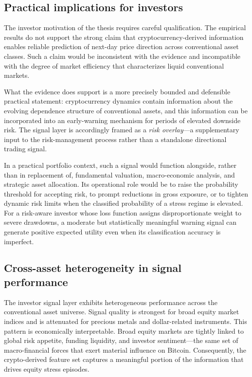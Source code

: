 \subsection{Practical implications for investors}

The investor motivation of the thesis requires careful qualification. The empirical results do not support the strong claim that cryptocurrency-derived information enables reliable prediction of next-day price direction across conventional asset classes. Such a claim would be inconsistent with the evidence and incompatible with the degree of market efficiency that characterizes liquid conventional markets.

What the evidence does support is a more precisely bounded and defensible practical statement: cryptocurrency dynamics contain information about the evolving dependence structure of conventional assets, and this information can be incorporated into an early-warning mechanism for periods of elevated downside risk. The signal layer is accordingly framed as a \emph{risk overlay}---a supplementary input to the risk-management process rather than a standalone directional trading signal.

In a practical portfolio context, such a signal would function alongside, rather than in replacement of, fundamental valuation, macro-economic analysis, and strategic asset allocation. Its operational role would be to raise the probability threshold for accepting risk, to prompt reductions in gross exposure, or to tighten dynamic risk limits when the classified probability of a stress regime is elevated. For a risk-aware investor whose loss function assigns disproportionate weight to severe drawdowns, a moderate but statistically meaningful warning signal can generate positive expected utility even when its classification accuracy is imperfect.

\subsection{Cross-asset heterogeneity in signal performance}

The investor signal layer exhibits heterogeneous performance across the conventional asset universe. Signal quality is strongest for broad equity market indices and is attenuated for precious metals and dollar-related instruments. This pattern is economically interpretable. Broad equity markets are tightly linked to global risk appetite, funding liquidity, and investor sentiment---the same set of macro-financial forces that exert material influence on Bitcoin. Consequently, the crypto-derived feature set captures a meaningful portion of the information that drives equity stress episodes.

